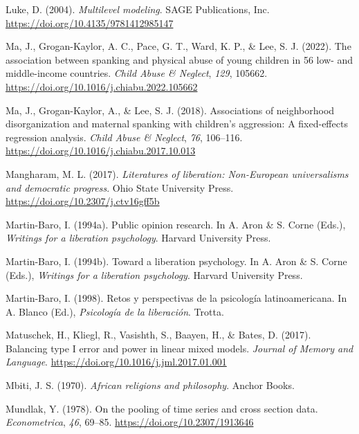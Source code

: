 \documentclass[
  letterpaper,
  DIV=11,
  numbers=noendperiod]{scrreprt}
\newlength{\cslhangindent}
\newlength{\cslentryspacingunit} %
\newenvironment{CSLReferences}[2] %
 {%
  \setlength{\parindent}{0pt}
  \ifodd #1
  \let\oldpar\par
  \def\par{\hangindent=\cslhangindent\oldpar}
  \fi
  \setlength{\parskip}{#2\cslentryspacingunit}
 }%
 {}
\begin{document}
\begin{CSLReferences}{1}{0}
\leavevmode{}%
Luke, D. (2004). \emph{Multilevel modeling}. SAGE Publications, Inc.
\url{https://doi.org/10.4135/9781412985147}

\leavevmode{}%
Ma, J., Grogan-Kaylor, A. C., Pace, G. T., Ward, K. P., \& Lee, S. J.
(2022). {The association between spanking and physical abuse of young
children in 56 low- and middle-income countries}. \emph{Child Abuse \&
Neglect}, \emph{129}, 105662.
\url{https://doi.org/10.1016/j.chiabu.2022.105662}

\leavevmode{}%
Ma, J., Grogan-Kaylor, A., \& Lee, S. J. (2018). Associations of
neighborhood disorganization and maternal spanking with children's
aggression: A fixed-effects regression analysis. \emph{Child Abuse \&
Neglect}, \emph{76}, 106--116.
\url{https://doi.org/10.1016/j.chiabu.2017.10.013}

\leavevmode{}%
Mangharam, M. L. (2017). \emph{Literatures of liberation: Non-{E}uropean
universalisms and democratic progress}. Ohio State University Press.
\url{https://doi.org/10.2307/j.ctv16gff5b}

\leavevmode{}%
Martin-Baro, I. (1994a). Public opinion research. In A. Aron \& S. Corne
(Eds.), \emph{Writings for a liberation psychology}. Harvard University
Press.

\leavevmode{}%
Martin-Baro, I. (1994b). Toward a liberation psychology. In A. Aron \&
S. Corne (Eds.), \emph{Writings for a liberation psychology}. Harvard
University Press.

\leavevmode{}%
Martin-Baro, I. (1998). {Retos y perspectivas de la psicología
latinoamericana}. In A. Blanco (Ed.), \emph{Psicología de la
liberación}. Trotta.

\leavevmode{}%
Matuschek, H., Kliegl, R., Vasishth, S., Baayen, H., \& Bates, D.
(2017). Balancing type {I} error and power in linear mixed models.
\emph{Journal of Memory and Language}.
\url{https://doi.org/10.1016/j.jml.2017.01.001}

\leavevmode{}%
Mbiti, J. S. (1970). \emph{African religions and philosophy}. Anchor
Books.

\leavevmode{}%
Mundlak, Y. (1978). On the pooling of time series and cross section
data. \emph{Econometrica}, \emph{46}, 69--85.
\url{https://doi.org/10.2307/1913646}


\end{CSLReferences}
\end{document}
